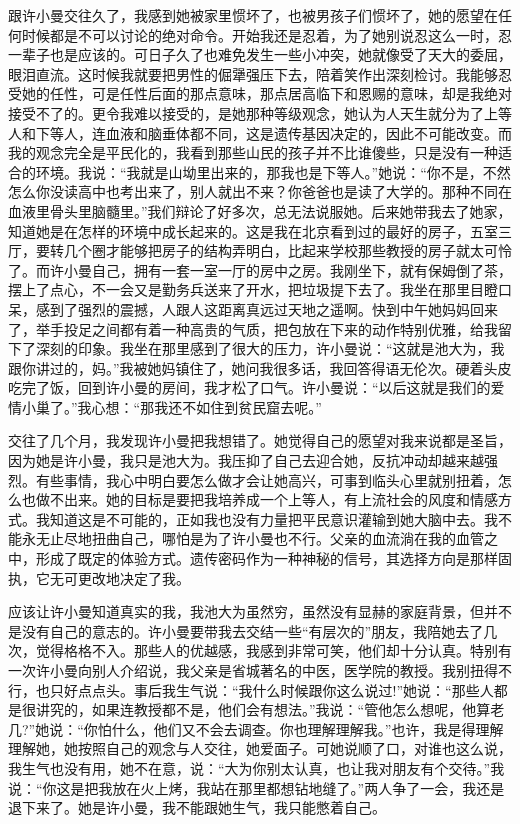 \documentclass[12pt,oneside]{book}
\begin{document}
跟许小曼交往久了，我感到她被家里惯坏了，也被男孩子们惯坏了，她的愿望在任何时候都是不可以讨论的绝对命令。开始我还是忍着，为了她别说忍这么一时，忍一辈子也是应该的。可日子久了也难免发生一些小冲突，她就像受了天大的委屈，眼泪直流。这时候我就要把男性的倔犟强压下去，陪着笑作出深刻检讨。我能够忍受她的任性，可是任性后面的那点意味，那点居高临下和恩赐的意味，却是我绝对接受不了的。更令我难以接受的，是她那种等级观念，她认为人天生就分为了上等人和下等人，连血液和脑垂体都不同，这是遗传基因决定的，因此不可能改变。而我的观念完全是平民化的，我看到那些山民的孩子并不比谁傻些，只是没有一种适合的环境。我说：``我就是山坳里出来的，那我也是下等人。''她说：``你不是，不然怎么你没读高中也考出来了，别人就出不来？你爸爸也是读了大学的。那种不同在血液里骨头里脑髓里。''我们辩论了好多次，总无法说服她。后来她带我去了她家，知道她是在怎样的环境中成长起来的。这是我在北京看到过的最好的房子，五室三厅，要转几个圈才能够把房子的结构弄明白，比起来学校那些教授的房子就太可怜了。而许小曼自己，拥有一套一室一厅的房中之房。我刚坐下，就有保姆倒了茶，摆上了点心，不一会又是勤务兵送来了开水，把垃圾提下去了。我坐在那里目瞪口呆，感到了强烈的震撼，人跟人这距离真远过天地之遥啊。快到中午她妈妈回来了，举手投足之间都有着一种高贵的气质，把包放在下来的动作特别优雅，给我留下了深刻的印象。我坐在那里感到了很大的压力，许小曼说：``这就是池大为，我跟你讲过的，妈。''我被她妈镇住了，她问我很多话，我回答得语无伦次。硬着头皮吃完了饭，回到许小曼的房间，我才松了口气。许小曼说：``以后这就是我们的爱情小巢了。''我心想：``那我还不如住到贫民窟去呢。''

交往了几个月，我发现许小曼把我想错了。她觉得自己的愿望对我来说都是圣旨，因为她是许小曼，我只是池大为。我压抑了自己去迎合她，反抗冲动却越来越强烈。有些事情，我心中明白要怎么做才会让她高兴，可事到临头心里就别扭着，怎么也做不出来。她的目标是要把我培养成一个上等人，有上流社会的风度和情感方式。我知道这是不可能的，正如我也没有力量把平民意识灌输到她大脑中去。我不能永无止尽地扭曲自己，哪怕是为了许小曼也不行。父亲的血流淌在我的血管之中，形成了既定的体验方式。遗传密码作为一种神秘的信号，其选择方向是那样固执，它无可更改地决定了我。

应该让许小曼知道真实的我，我池大为虽然穷，虽然没有显赫的家庭背景，但并不是没有自己的意志的。许小曼要带我去交结一些``有层次的''朋友，我陪她去了几次，觉得格格不入。那些人的优越感，我感到非常可笑，他们却十分认真。特别有一次许小曼向别人介绍说，我父亲是省城著名的中医，医学院的教授。我别扭得不行，也只好点点头。事后我生气说：``我什么时候跟你这么说过!''她说：``那些人都是很讲究的，如果连教授都不是，他们会有想法。''我说：``管他怎么想呢，他算老几?''她说：``你怕什么，他们又不会去调查。你也理解理解我。''也许，我是得理解理解她，她按照自己的观念与人交往，她爱面子。可她说顺了口，对谁也这么说，我生气也没有用，她不在意，说：``大为你别太认真，也让我对朋友有个交待。''我说：``你这是把我放在火上烤，我站在那里都想钻地缝了。''两人争了一会，我还是退下来了。她是许小曼，我不能跟她生气，我只能憋着自己。
\end{document}
